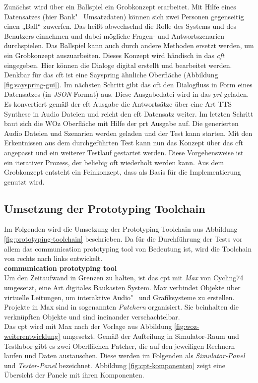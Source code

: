 Zunächst wird über ein Ballspiel ein Grobkonzept erarbeitet. Mit Hilfe eines Datensatzes (hier \zB Bank"~ \bzw Umsatzdaten) können sich zwei Personen gegenseitig einen „Ball“ zuwerfen. Das heißt abwechselnd die Rolle des Systems und des Benutzers einnehmen und dabei mögliche Fragen- und Antwortszenarien durchspielen. Das Ballspiel kann auch durch andere Methoden ersetzt werden, um ein Grobkonzept auszuarbeiten. Dieses Konzept wird händisch in das \textit{\ac{cft}} eingegeben. Hier können die Dialoge digital erstellt und bearbeitet werden. Denkbar für das \ac{cft} ist eine Sayspring ähnliche Oberfläche (\vgl Abbildung \ref{fig:sayspring-gui}). Im nächsten Schritt gibt das \ac{cft} den Dialogfluss in Form eines Datensatzes (\zB  in \textit{\ac{JSON}} Format) aus. Diese Ausgabedatei wird in das \textit{\ac{prt}} geladen. Es konvertiert gemäß der \ac{cft} Ausgabe die Antwortsätze über eine Art \ac{TTS} Synthese in Audio Dateien und reicht den \ac{cft} Datensatz weiter. Im letzten Schritt baut sich die \ac{WOz} Oberfläche mit Hilfe der \ac{prt} Ausgabe auf. Die generierten Audio Dateien und Szenarien werden geladen und der Test kann starten. Mit den Erkentnissen aus dem durchgeführten Test kann nun das Konzept über das \ac{cft} angepasst und ein weiterer Testlauf gestartet werden. Diese Vorgehensweise ist ein iterativer Prozess, der beliebig oft wiederholt werden kann. Aus dem Grobkonzept entsteht ein Feinkonzept, dass als Basis für die Implementierung genutzt wird.

\subsection{Umsetzung der Prototyping Toolchain}
\label{subsec:umsetzung-prototyping-toolchain}
Im Folgenden wird die Umsetzung der Prototyping Toolchain aus Abbildung \ref{fig:prototyping-toolchain} beschrieben. Da für die Durchführung der Tests vor allem das communication prototyping tool von Bedeutung ist, wird die Toolchain von rechts nach links entwickelt.\\

\textbf{communication prototyping tool}\\
Um den Zeitaufwand in Grenzen zu halten, ist das \ac{cpt} mit \textit{Max} von Cycling74 \cite{max-msp} umgesetzt, eine Art digitales Baukasten System. Max verbindet Objekte über virtuelle Leitungen, um interaktive Audio"~ und Grafiksysteme zu erstellen. Projekte in Max sind in sogenannten \textit{Patchern} organisiert. Sie beinhalten die verknüpften Objekte und sind ineinander verschachtelbar.\\
Das \ac{cpt} wird mit Max nach der Vorlage aus Abbildung \ref{fig:woz-weiterentwicklung} umgesetzt. Gemäß der Aufteilung in Simulator-Raum und Testlabor gibt es zwei Oberflächen \bzw Patcher, die auf den jeweiligen Rechnern laufen und Daten austauschen. Diese werden im Folgenden als \textit{Simulator-Panel} und \textit{Tester-Panel} bezeichnet. Abbildung \ref{fig:cpt-komponenten} zeigt eine Übersicht der Panele mit ihren Komponenten. 

